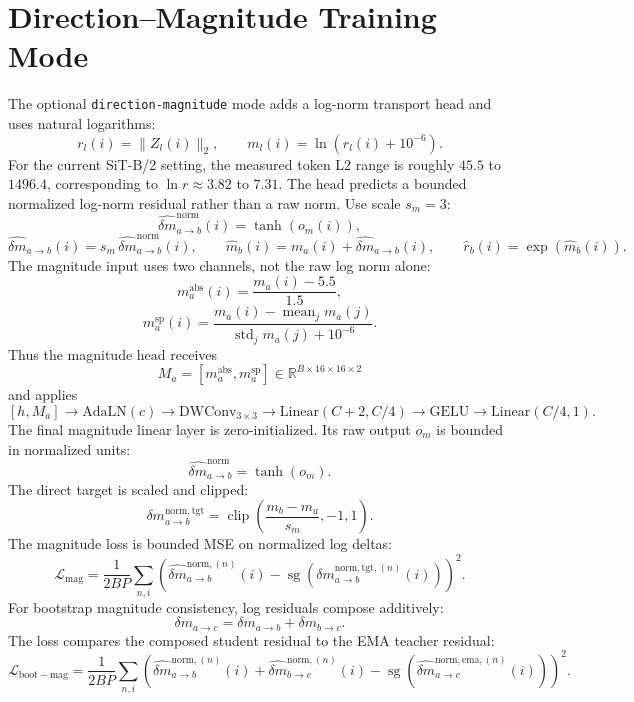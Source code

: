 \documentclass[11pt]{article}
\begin{document}
\section{Direction--Magnitude Training Mode}
The optional \texttt{direction-magnitude} mode adds a log-norm transport head
and uses natural logarithms:
\[
    r_l(i)=\|Z_l(i)\|_2,\qquad
    m_l(i)=\ln(r_l(i)+10^{-6}).
\]
For the current SiT-B/2 setting, the measured token L2 range is roughly
$45.5$ to $1496.4$, corresponding to $\ln r\approx 3.82$ to $7.31$.
The head predicts a bounded normalized log-norm residual rather than a raw
norm. Use scale $s_m=3$:
\[
    \hat{\delta m}^{\mathrm{norm}}_{a\rightarrow b}(i)=\tanh(o_m(i)),
\]
\[
    \hat{\delta m}_{a\rightarrow b}(i)
    =
    s_m\,\hat{\delta m}^{\mathrm{norm}}_{a\rightarrow b}(i),
    \qquad
    \hat m_b(i)=m_a(i)+\hat{\delta m}_{a\rightarrow b}(i),
    \qquad
    \hat r_b(i)=\exp(\hat m_b(i)).
\]
The magnitude input uses two channels, not the raw log norm alone:
\[
    m_a^{\mathrm{abs}}(i)=\frac{m_a(i)-5.5}{1.5},
\]
\[
    m_a^{\mathrm{sp}}(i)=
    \frac{m_a(i)-\operatorname{mean}_{j}m_a(j)}
    {\operatorname{std}_{j}m_a(j)+10^{-6}}.
\]
Thus the magnitude head receives
\[
    M_a=[m_a^{\mathrm{abs}},m_a^{\mathrm{sp}}]\in\mathbb{R}^{B\times16\times16\times2}
\]
and applies
\[
    [h,M_a]\rightarrow \mathrm{AdaLN}(c)\rightarrow
    \mathrm{DWConv}_{3\times3}\rightarrow
    \mathrm{Linear}(C+2,C/4)\rightarrow\mathrm{GELU}\rightarrow
    \mathrm{Linear}(C/4,1).
\]
The final magnitude linear layer is zero-initialized. Its raw output $o_m$ is
bounded in normalized units:
\[
    \hat{\delta m}^{\mathrm{norm}}_{a\rightarrow b}=\tanh(o_m).
\]
The direct target is scaled and clipped:
\[
    \delta m_{a\rightarrow b}^{\mathrm{norm,tgt}}
    =
    \operatorname{clip}\left(\frac{m_b-m_a}{s_m},-1,1\right).
\]
The magnitude loss is bounded MSE on normalized log deltas:
\[
    \mathcal{L}_{\mathrm{mag}}
    =
    \frac{1}{2BP}\sum_{n,i}
    \left(
    \hat{\delta m}_{a\rightarrow b}^{\mathrm{norm},(n)}(i)
    -
    \operatorname{sg}\!\left(
    \delta m_{a\rightarrow b}^{\mathrm{norm,tgt},(n)}(i)
    \right)
    \right)^2.
\]
For bootstrap magnitude consistency, log residuals compose additively:
\[
    \delta m_{a\rightarrow c}
    =
    \delta m_{a\rightarrow b}+\delta m_{b\rightarrow c}.
\]
The loss compares the composed student residual to the EMA teacher residual:
\[
    \mathcal{L}_{\mathrm{boot-mag}}
    =
    \frac{1}{2BP}\sum_{n,i}
    \left(
    \hat{\delta m}_{a\rightarrow b}^{\mathrm{norm},(n)}(i)
    +\hat{\delta m}_{b\rightarrow c}^{\mathrm{norm},(n)}(i)
    -
    \operatorname{sg}\!\left(
    \hat{\delta m}_{a\rightarrow c}^{\mathrm{norm,ema},(n)}(i)
    \right)
    \right)^2.
\]
\end{document}
